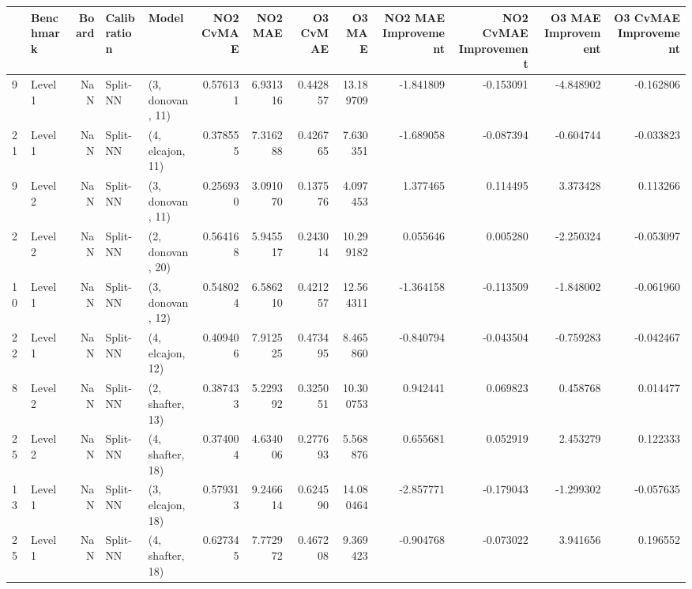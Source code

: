 \begin{tabular}{llrllrrrrrrrr}
\toprule
{} & Benchmark &  Board &    Calibration &             Model &  NO2 CvMAE &    NO2 MAE &  O3 CvMAE &     O3 MAE &  NO2 MAE Improvement &  NO2 CvMAE Improvement &  O3 MAE Improvement &  O3 CvMAE Improvement \\
\midrule
9  &   Level 1 &    NaN &       Split-NN &  (3, donovan, 11) &   0.576131 &   6.931316 &  0.442857 &  13.189709 &            -1.841809 &              -0.153091 &           -4.848902 &             -0.162806 \\
21 &   Level 1 &    NaN &       Split-NN &  (4, elcajon, 11) &   0.378555 &   7.316288 &  0.426765 &   7.630351 &            -1.689058 &              -0.087394 &           -0.604744 &             -0.033823 \\
9  &   Level 2 &    NaN &       Split-NN &  (3, donovan, 11) &   0.256930 &   3.091070 &  0.137576 &   4.097453 &             1.377465 &               0.114495 &            3.373428 &              0.113266 \\
2  &   Level 2 &    NaN &       Split-NN &  (2, donovan, 20) &   0.564168 &   5.945517 &  0.243014 &  10.299182 &             0.055646 &               0.005280 &           -2.250324 &             -0.053097 \\
10 &   Level 1 &    NaN &       Split-NN &  (3, donovan, 12) &   0.548024 &   6.586210 &  0.421257 &  12.564311 &            -1.364158 &              -0.113509 &           -1.848002 &             -0.061960 \\
22 &   Level 1 &    NaN &       Split-NN &  (4, elcajon, 12) &   0.409406 &   7.912525 &  0.473495 &   8.465860 &            -0.840794 &              -0.043504 &           -0.759283 &             -0.042467 \\
8  &   Level 2 &    NaN &       Split-NN &  (2, shafter, 13) &   0.387433 &   5.229392 &  0.325051 &  10.300753 &             0.942441 &               0.069823 &            0.458768 &              0.014477 \\
25 &   Level 2 &    NaN &       Split-NN &  (4, shafter, 18) &   0.374004 &   4.634006 &  0.277693 &   5.568876 &             0.655681 &               0.052919 &            2.453279 &              0.122333 \\
13 &   Level 1 &    NaN &       Split-NN &  (3, elcajon, 18) &   0.579313 &   9.246614 &  0.624590 &  14.080464 &            -2.857771 &              -0.179043 &           -1.299302 &             -0.057635 \\
25 &   Level 1 &    NaN &       Split-NN &  (4, shafter, 18) &   0.627345 &   7.772972 &  0.467208 &   9.369423 &            -0.904768 &              -0.073022 &            3.941656 &              0.196552 \\

\end{tabular}
